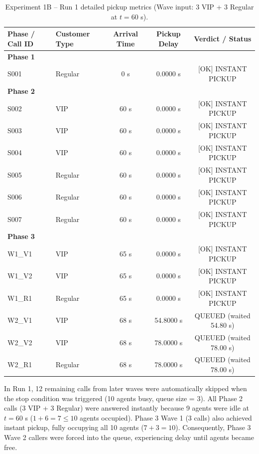 \documentclass[11pt]{article}
\begin{document}
\begin{table}[htbp]
\centering
\small
\begin{tabular}{llccc}
\toprule
\textbf{Phase / Call ID} & \textbf{Customer Type} & \textbf{Arrival Time} & \textbf{Pickup Delay} & \textbf{Verdict / Status} \\
\midrule
\textbf{Phase 1} & & & & \\
S001 & Regular & 0 s & 0.0000 s & [OK] INSTANT PICKUP \\
\midrule
\textbf{Phase 2} & & & & \\
S002 & VIP & 60 s & 0.0000 s & [OK] INSTANT PICKUP \\
S003 & VIP & 60 s & 0.0000 s & [OK] INSTANT PICKUP \\
S004 & VIP & 60 s & 0.0000 s & [OK] INSTANT PICKUP \\
S005 & Regular & 60 s & 0.0000 s & [OK] INSTANT PICKUP \\
S006 & Regular & 60 s & 0.0000 s & [OK] INSTANT PICKUP \\
S007 & Regular & 60 s & 0.0000 s & [OK] INSTANT PICKUP \\
\midrule
\textbf{Phase 3} & & & & \\
W1\_V1 & VIP & 65 s & 0.0000 s & [OK] INSTANT PICKUP \\
W1\_V2 & VIP & 65 s & 0.0000 s & [OK] INSTANT PICKUP \\
W1\_R1 & Regular & 65 s & 0.0000 s & [OK] INSTANT PICKUP \\
W2\_V1 & VIP & 68 s & 54.8000 s & QUEUED (waited 54.80 s) \\
W2\_V2 & VIP & 68 s & 78.0000 s & QUEUED (waited 78.00 s) \\
W2\_R1 & Regular & 68 s & 78.0000 s & QUEUED (waited 78.00 s) \\
\bottomrule
\end{tabular}
\caption{Experiment 1B -- Run 1 detailed pickup metrics (Wave input: 3 VIP + 3 Regular at $t=60$ s).}
\end{table}

In Run 1, 12 remaining calls from later waves were automatically skipped when the stop condition was triggered (10 agents busy, queue size = 3). All Phase 2 calls (3 VIP + 3 Regular) were answered instantly because 9 agents were idle at $t=60$ s ($1 + 6 = 7 \leq 10$ agents occupied). Phase 3 Wave 1 (3 calls) also achieved instant pickup, fully occupying all 10 agents ($7 + 3 = 10$). Consequently, Phase 3 Wave 2 callers were forced into the queue, experiencing delay until agents became free.
\end{document}

